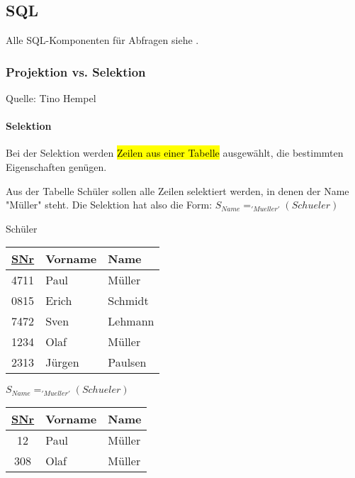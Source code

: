 \subsection{SQL}
\label{sec:SQL}

Alle SQL-Komponenten für Abfragen siehe .

\subsubsection{Projektion vs. Selektion}
\label{sec:ProjektionSelektion}

Quelle: Tino Hempel \cite{projektionSelektion}

\paragraph{Selektion} Bei der Selektion werden \hl{Zeilen aus einer Tabelle} ausgewählt, die bestimmten Eigenschaften genügen.

Aus der Tabelle Schüler sollen alle Zeilen selektiert werden, in denen der Name "Müller" steht. 
Die Selektion hat also die Form: $S_{Name} = _{'Mueller'}(Schueler)$

\vspace{1em}

\begin{minipage}{.45\textwidth}
	\begin{center}
		Schüler \\
		\vspace{1em}
		\bgroup
		\setlength{\tabcolsep}{1em}
		\def\arraystretch{1.5}
		\begin{tabular}{|c|l|l|}
			\hline
			\rowcolor{tableLightGray}\underline{SNr} & Vorname & Name \\
			\hline
			4711 & Paul & Müller \\
			\hline
			0815 & Erich & Schmidt \\
			\hline
			7472 & Sven & Lehmann \\
			\hline
			1234 & Olaf & Müller \\
			\hline
			2313 & Jürgen & Paulsen \\
			\hline
		\end{tabular}
		\egroup
	\end{center}
\end{minipage}
\hfill
\begin{minipage}{.45\textwidth}
	\begin{center}
		$S_{Name} = _{'Mueller'}(Schueler)$ \\
		\vspace{1em}
		\bgroup
		\setlength{\tabcolsep}{1em}
		\def\arraystretch{1.5}
		\begin{tabular}{|c|l|l|}
			\hline
			\rowcolor{tableLightGray}\underline{SNr} & Vorname & Name \\
			\hline
			12 & Paul & Müller \\
			\hline
			308 & Olaf & Müller \\
			\hline
		\end{tabular}
		\egroup
	\end{center}
\end{minipage}

